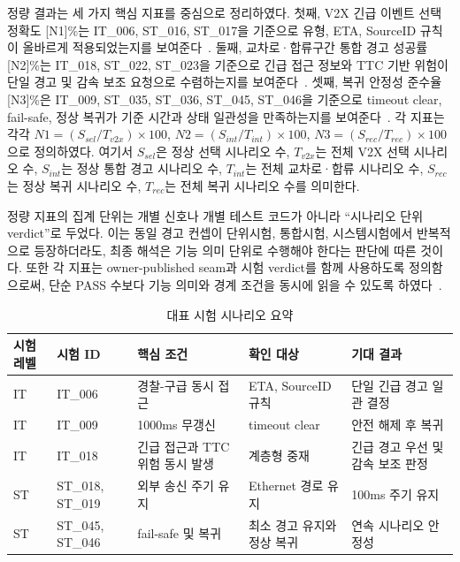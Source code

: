 \documentclass[10pt,a4paper,twocolumn]{article}
\begin{document}
정량 결과는 세 가지 핵심 지표를 중심으로 정리하였다. 첫째, V2X 긴급 이벤트 선택 정확도 [N1]\%는 IT\_006, ST\_016, ST\_017을 기준으로 유형, ETA, SourceID 규칙이 올바르게 적용되었는지를 보여준다~\cite{integration_test,system_test}. 둘째, 교차로·합류구간 통합 경고 성공률 [N2]\%는 IT\_018, ST\_022, ST\_023을 기준으로 긴급 접근 정보와 TTC 기반 위험이 단일 경고 및 감속 보조 요청으로 수렴하는지를 보여준다~\cite{integration_test,system_test}. 셋째, 복귀 안정성 준수율 [N3]\%은 IT\_009, ST\_035, ST\_036, ST\_045, ST\_046을 기준으로 timeout clear, fail-safe, 정상 복귀가 기준 시간과 상태 일관성을 만족하는지를 보여준다~\cite{integration_test,master_test_matrix,system_test}. 각 지표는 각각 $N1=(S_{sel}/T_{v2x})\times100$, $N2=(S_{int}/T_{int})\times100$, $N3=(S_{rec}/T_{rec})\times100$으로 정의하였다. 여기서 $S_{sel}$은 정상 선택 시나리오 수, $T_{v2x}$는 전체 V2X 선택 시나리오 수, $S_{int}$는 정상 통합 경고 시나리오 수, $T_{int}$는 전체 교차로·합류 시나리오 수, $S_{rec}$는 정상 복귀 시나리오 수, $T_{rec}$는 전체 복귀 시나리오 수를 의미한다.

정량 지표의 집계 단위는 개별 신호나 개별 테스트 코드가 아니라 ``시나리오 단위 verdict''로 두었다. 이는 동일 경고 컨셉이 단위시험, 통합시험, 시스템시험에서 반복적으로 등장하더라도, 최종 해석은 기능 의미 단위로 수행해야 한다는 판단에 따른 것이다. 또한 각 지표는 owner-published seam과 시험 verdict를 함께 사용하도록 정의함으로써, 단순 PASS 수보다 기능 의미와 경계 조건을 동시에 읽을 수 있도록 하였다~\cite{comm_spec,master_test_matrix,system_test,sysvar_spec,suite_policy}.

\begin{table}[t]
\caption{대표 시험 시나리오 요약}
\label{tab:test_scenarios}
\centering
\footnotesize
\setlength{\tabcolsep}{4pt}
\begin{tabularx}{\textwidth}{>{\raggedright\arraybackslash}p{1.7cm} >{\raggedright\arraybackslash}p{2.1cm} >{\raggedright\arraybackslash}p{3.6cm} >{\raggedright\arraybackslash}p{3.0cm} >{\raggedright\arraybackslash}X}
\toprule
시험 레벨 & 시험 ID & 핵심 조건 & 확인 대상 & 기대 결과 \\
\midrule
IT & IT\_006 & 경찰-구급 동시 접근 & ETA, SourceID 규칙 & 단일 긴급 경고 일관 결정 \\
IT & IT\_009 & 1000ms 무갱신 & timeout clear & 안전 해제 후 복귀 \\
IT & IT\_018 & 긴급 접근과 TTC 위험 동시 발생 & 계층형 중재 & 긴급 경고 우선 및 감속 보조 판정 \\
ST & ST\_018, ST\_019 & 외부 송신 주기 유지 & Ethernet 경로 유지 & 100ms 주기 유지 \\
ST & ST\_045, ST\_046 & fail-safe 및 복귀 & 최소 경고 유지와 정상 복귀 & 연속 시나리오 안정성 \\
\bottomrule
\end{tabularx}
\end{table}
\end{document}
